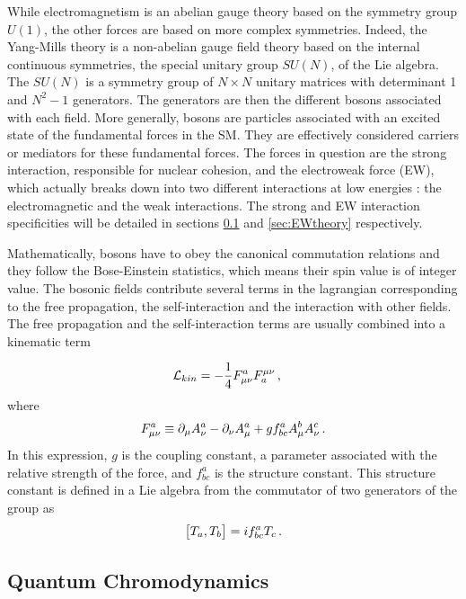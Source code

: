 While electromagnetism is an abelian gauge theory based on the symmetry group $U(1)$, the other forces are based on more complex symmetries. Indeed, the Yang-Mills theory \cite{PhysRev.96.191} is a non-abelian gauge field theory based on the internal continuous symmetries, the special unitary group $SU(N)$, of the Lie algebra. The $SU(N)$ is a symmetry group of $N \times N$ unitary matrices with determinant 1 and $N^2 -1$ generators. The generators are then the different bosons associated with each field.
More generally, bosons are particles associated with an excited state of the fundamental forces in the SM. They are effectively considered carriers or mediators for these fundamental forces. The forces in question are the strong interaction, responsible for nuclear cohesion, and the electroweak force (EW), which actually breaks down into two different interactions at low energies : the electromagnetic and the weak interactions. The strong and EW interaction specificities will be detailed in sections \ref{sec:QCD} and \ref{sec:EWtheory} respectively. \newline

Mathematically, bosons have to obey the canonical commutation relations and they follow the Bose-Einstein statistics, which means their spin value is of integer value. The bosonic fields contribute several terms in the lagrangian corresponding to the free propagation, the self-interaction and the interaction with other fields. The free propagation and the self-interaction terms are usually combined into a kinematic term

\begin{equation}
    \Lagr_{kin} = -\frac{1}{4}F^{a}_{\mu\nu}F_{a}^{\mu\nu} \msep
\end{equation}
where
\begin{equation}
    F^{a}_{\mu\nu} \equiv \partial_{\mu}A_{\nu}^a - \partial_{\nu}A_{\mu}^a + g f_{bc}^a A_{\mu}^b A_{\nu}^c \mend
\end{equation}
In this expression, $g$ is the coupling constant, a parameter associated with the relative strength of the force, and $f_{bc}^a$ is the structure constant. This structure constant is defined in a Lie algebra from the commutator of two generators of the group as
\begin{equation}
    \big[ T_a , T_b \big] = i f_{bc}^a T_c \mend
    \label{eq:commut}
\end{equation}

\subsection{Quantum Chromodynamics}
\label{sec:QCD}

